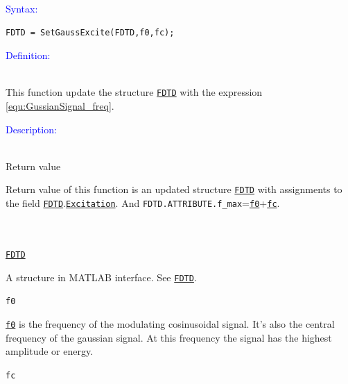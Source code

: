 \textcolor{blue}{\begin{large}Syntax:\end{large}}
 \begin{lstlisting}
FDTD = SetGaussExcite(FDTD,f0,fc);
 \end{lstlisting}

\textcolor{blue}{\begin{large}Definition:\end{large}}\\
      This function update the structure \hyperref[para:FDTD]{\texttt{FDTD}} with the expression \ref{equ:GussianSignal_freq}. 

\textcolor{blue}{\begin{large}Description:\end{large}}\\
	      Return value 
	\begin{myindentpar}
      Return value of this function is an updated structure \hyperref[para:FDTD]{\texttt{FDTD}} with assignments to the field \hyperref[para:FDTD]{\texttt{FDTD}}.\hyperref[para:Excitation]{\texttt{Excitation}}. And \texttt{FDTD.ATTRIBUTE.f\_max}=\hyperref[para:f0]{\texttt{f0}}+\hyperref[para:fc]{\texttt{fc}}.
      \end{myindentpar}
	      \\ \\
	\hyperref[para:FDTD]{\texttt{FDTD}} 
	    \begin{myindentpar}
		A structure in MATLAB interface. See \hyperref[para:FDTD]{\texttt{FDTD}}.
	    \end{myindentpar}
	\texttt{f0}   \label{para:f0} %
	    \begin{myindentpar}
		\hyperref[para:f0]{\texttt{f0}}  is the frequency of the modulating cosinusoidal signal. It's also the central frequency of the gaussian signal. At this frequency the signal has the highest amplitude or energy.
	    \end{myindentpar}
	\texttt{fc}   \label{para:fc} %

